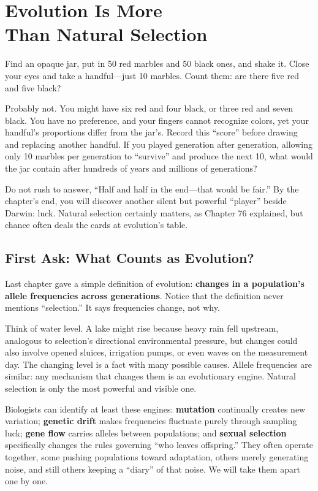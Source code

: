 \chapter[Evolution Is More Than Natural Selection]{Evolution Is More\protect\\ Than Natural Selection}

\begin{kaichang}
Find an opaque jar, put in 50 red marbles and 50 black ones, and shake it. Close your eyes and take a handful---just 10 marbles. Count them: are there five red and five black?

Probably not. You might have six red and four black, or three red and seven black. You have no preference, and your fingers cannot recognize colors, yet your handful's proportions differ from the jar's. Record this ``score'' before drawing and replacing another handful. If you played generation after generation, allowing only 10 marbles per generation to ``survive'' and produce the next 10, what would the jar contain after hundreds of years and millions of generations?

Do not rush to answer, ``Half and half in the end---that would be fair.'' By the chapter's end, you will discover another silent but powerful ``player'' beside Darwin: luck. Natural selection certainly matters, as Chapter 76 explained, but chance often deals the cards at evolution's table.
\end{kaichang}

\section{First Ask: What Counts as Evolution?}

Last chapter gave a simple definition of evolution: \textbf{changes in a population's allele frequencies across generations}. Notice that the definition never mentions ``selection.'' It says frequencies change, not why.

Think of water level. A lake might rise because heavy rain fell upstream, analogous to selection's directional environmental pressure, but changes could also involve opened sluices, irrigation pumps, or even waves on the measurement day. The changing level is a fact with many possible causes. Allele frequencies are similar: any mechanism that changes them is an evolutionary engine. Natural selection is only the most powerful and visible one.

Biologists can identify at least these engines: \textbf{mutation} continually creates new variation; \textbf{genetic drift} makes frequencies fluctuate purely through sampling luck; \textbf{gene flow} carries alleles between populations; and \textbf{sexual selection} specifically changes the rules governing ``who leaves offspring.'' They often operate together, some pushing populations toward adaptation, others merely generating noise, and still others keeping a ``diary'' of that noise. We will take them apart one by one.

